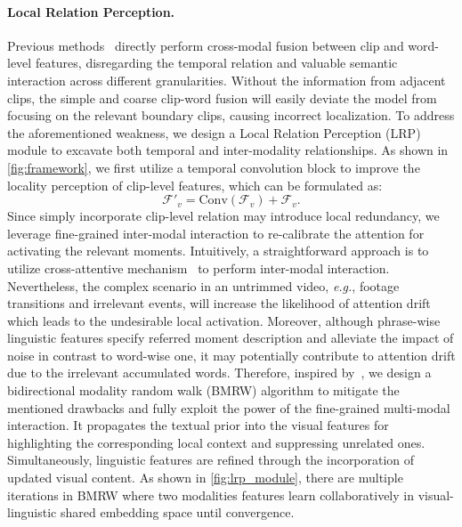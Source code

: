 \paragraph{Local Relation Perception.}
Previous methods~\cite{momentdetr, umt, qddetr} directly perform cross-modal fusion between clip and word-level features, disregarding the temporal relation and valuable semantic interaction across different granularities. Without the information from adjacent clips, the simple and coarse clip-word fusion will easily deviate the model from focusing on the relevant boundary clips, causing incorrect localization. 
To address the aforementioned weakness, we design a Local Relation Perception (LRP) module to excavate both temporal and inter-modality relationships.
As shown in \cref{fig:framework}, we first utilize a temporal convolution block to improve the locality perception of clip-level features, which can be formulated as:
\begin{equation}
    \mathcal{F'}_{v} = \mathrm{Conv}\left(\mathcal{F}_v\right) + \mathcal{F}_v.
\end{equation}
Since simply incorporate clip-level relation may introduce local redundancy, we leverage fine-grained inter-modal interaction to re-calibrate the attention for activating the relevant moments. 
Intuitively, a straightforward approach is to utilize cross-attentive mechanism~\cite{qddetr, umt} to perform inter-modal interaction.
Nevertheless, the complex scenario in an untrimmed video, \textit{e.g.}, footage transitions and irrelevant events, will increase the likelihood of attention drift which leads to the undesirable local activation.
Moreover, although phrase-wise linguistic features specify referred moment description and alleviate the impact of noise in contrast to word-wise one, it may potentially contribute to attention drift due to the irrelevant accumulated words.
Therefore, inspired by~\cite{rskp,Giannis2020,Grady2006}, we design a  
bidirectional modality random walk (BMRW) algorithm to mitigate the mentioned drawbacks and fully exploit the power of the fine-grained multi-modal interaction.
It propagates the textual prior into the visual features for highlighting the corresponding local context and suppressing unrelated ones.
Simultaneously, linguistic features are refined through the incorporation of updated visual content. 
As shown in \cref{fig:lrp_module}, there are multiple iterations in BMRW where two modalities features learn collaboratively in visual-linguistic shared embedding space until convergence.

